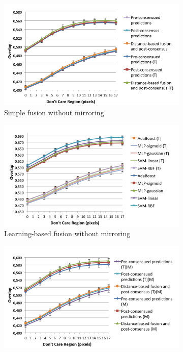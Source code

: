 \documentclass[10pt,twocolumn,letterpaper]{article}
\begin{document}
\begin{figure}[htpb]
\centering
\begin{subfigure}[b]{1\columnwidth}
	\includegraphics[width=\columnwidth]{simple_fusion.png}%
	\caption{Simple fusion without mirroring}%
	\label{}%
\end{subfigure}
\begin{subfigure}[b]{1\columnwidth}
	\includegraphics[width=\columnwidth]{learning_fusion.png}%
	\caption{Learning-based fusion without mirroring}%
	\label{}%
\end{subfigure}
\begin{subfigure}[b]{1\columnwidth}
	\includegraphics[width=\columnwidth]{simple_fusion_m.png}%

\end{subfigure}
\end{figure}
\end{document}
